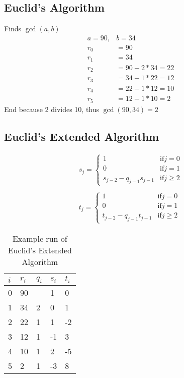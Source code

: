 
\subsection{Euclid's Algorithm}
\label{sec:euclids-algorithm}
Finds $\gcd(a, b)$
\begin{align*}
  a = 90,& b = 34 \\
  r_0 &= 90\\
  r_1 &= 34\\
  r_2 &= 90 - 2*34 = 22\\
  r_3 &= 34 - 1*22 = 12\\
  r_4 &= 22 - 1*12 = 10\\
  r_5 &= 12 - 1*10 = 2
\end{align*}
End because 2 divides 10, thus $\gcd(90, 34) = 2$

\subsection{Euclid's Extended Algorithm}
\label{sec:euclids-extended}
\begin{align*}
  s_j = \begin{cases}
    1 &\mbox{if} j = 0\\
    0 &\mbox{if} j = 1\\
    s_{j-2} - q_{j-1}s_{j-1} &\mbox{if} j \ge 2
  \end{cases}\\ \\
  t_j = \begin{cases}
    1 &\mbox{if} j = 0\\
    0 &\mbox{if} j = 1\\
    t_{j-2} - q_{j-1}t_{j-1} &\mbox{if} j \ge 2
  \end{cases}
\end{align*}

\begin{table}[H]
  \centering
  \begin{tabular}{lllll}
    $i$ & $r_i$ & $q_i$ & $s_i$ & $t_i$ \\ \hline
    0   & 90    &       & 1     & 0     \\
    1   & 34    & 2     & 0     & 1     \\
    2   & 22    & 1     & 1     & -2    \\
    3   & 12    & 1     & -1    & 3     \\
    4   & 10    & 1     & 2     & -5    \\
    5   & 2     & 1     & -3    & 8     \\
  \end{tabular}
  \caption{Example run of Euclid's Extended Algorithm}
\end{table}

